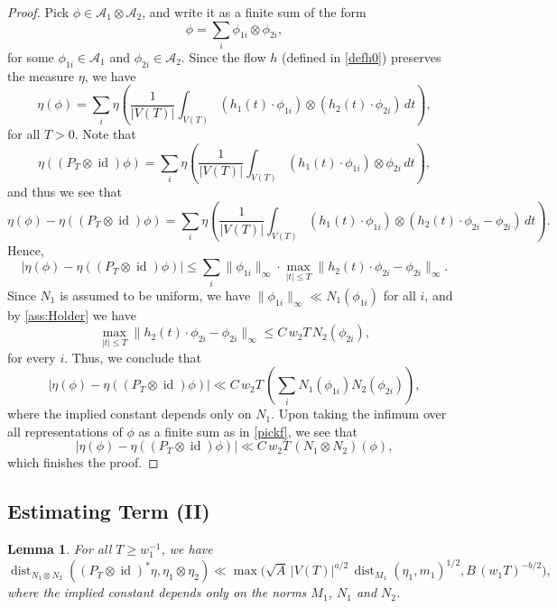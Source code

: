 \documentclass[11pt,reqno,a4paper]{amsart}
\numberwithin{equation}{section}
\newcommand{\cA}{\mathcal{A}}
\DeclareMathOperator{\dist}{dist}
\DeclareMathOperator{\id}{id}
\theoremstyle{theorem}
\newtheorem{lemma}[theorem]{Lemma}
\theoremstyle{definition}
\begin{document}
\begin{proof}
Pick $\phi \in \cA_1 \otimes \cA_2$, and write it as a finite sum of the form
\begin{equation}
\label{pickf}
\phi = \sum_i \phi_{1i} \otimes \phi_{2i},
\end{equation}
for some $\phi_{1i} \in \cA_1$ and $\phi_{2i} \in \cA_2$. Since the flow $h$ (defined in \eqref{defh0}) 
preserves the measure $\eta$, we have
\[
\eta(\phi) = \sum_i \eta\left( \frac{1}{|V(T)|} \int_{V(T)} (h_1(t) \cdot \phi_{1i}) \otimes (h_2(t) \cdot \phi_{2i}) \, dt \right),
\]
for all $T > 0$. Note that
\[
\eta((P_T \otimes \id)\phi) = \sum_i \eta\left( \frac{1}{|V(T)|} \int_{V(T)} (h_1(t) \cdot \phi_{1i}) \otimes \phi_{2i} \, dt \right),
\]
and thus we see that 
\[
\eta(\phi) - \eta((P_T \otimes \id)\phi) = \sum_{i} \eta\left( 
\frac{1}{|V(T)|} \int_{V(T)} (h_1(t) \cdot \phi_{1i}) \otimes (h_2(t) \cdot \phi_{2i} - \phi_{2i}) \, dt \right).
\]
Hence,
\[
| \eta(\phi) - \eta((P_T \otimes \id)\phi) | \leq \sum_i \|\phi_{1i}\|_\infty \cdot \max_{|t|\le T} \|h_2(t) \cdot \phi_{2i} - \phi_{2i}\|_\infty.
\]
Since $N_1$ is assumed to be uniform, we have $\|\phi_{1i}\|_\infty \ll N_1(\phi_{1i})$ for all $i$, and 
by \eqref{ass:Holder} we have
\[
\max_{|t|\le T} \|h_2(t) \cdot \phi_{2i} - \phi_{2i}\|_\infty \leq C\, w_{2} T\, N_2(\phi_{2i}),
\]
for every $i$. Thus, we conclude that
\[
| \eta(\phi) - \eta((P_T \otimes \id)\phi) | \ll C\,w_2 T\,  \left(\sum_i N_1(\phi_{1i}) N_2(\phi_{2i}) \right),
\]
where the implied constant depends only on $N_1$. Upon taking the infimum over all representations of $\phi$ as a finite sum as in \eqref{pickf}, we see that 
\[
| \eta(\phi) - \eta((P_T \otimes \id)\phi) | \ll C\,w_2T\, (N_1 \otimes N_2)(\phi),
\]
which finishes the proof.
\end{proof}

\subsection{Estimating Term (II)} 

\begin{lemma}
\label{lemmaII}
For all $T \ge w_1^{-1}$, we have
\[
\dist_{N_1 \otimes N_2}((P_T \otimes \id)^*\eta,\eta_1 \otimes \eta_2)
\ll
\max\big(\sqrt{A}\, |V(T)|^{a/2} \, \dist_{M_1}(\eta_1,m_1)^{1/2}, B\, (w_1T)^{-b/2}\big),
\]
where the implied constant depends only on the norms $M_1$, $N_1$ and $N_2$.
\end{lemma}

\medskip
\end{document}
